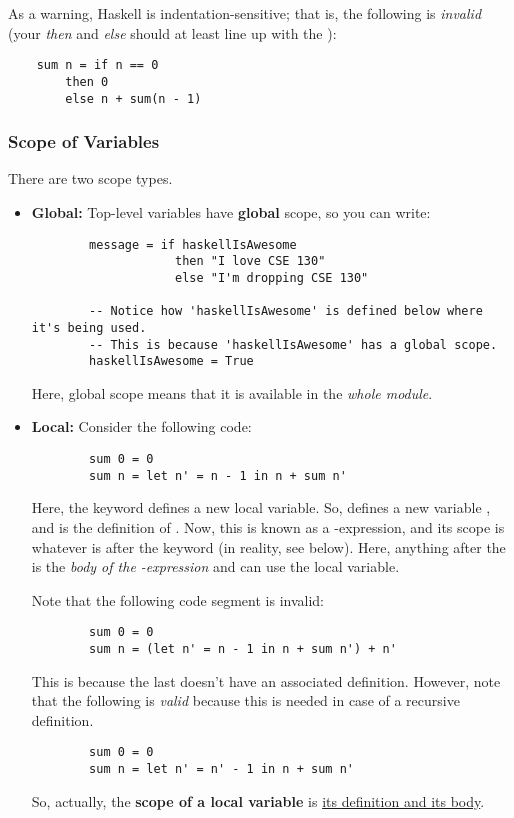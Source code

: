 \documentclass[letterpaper]{article}
\begin{document}
As a warning, Haskell is indentation-sensitive; that is, the following is \emph{invalid} (your \emph{then} and \emph{else} should at least line up with the ):
\begin{verbatim}
    sum n = if n == 0 
        then 0 
        else n + sum(n - 1)
\end{verbatim}

\subsubsection{Scope of Variables}
There are two scope types. 
\begin{itemize}
    \item \textbf{Global:} Top-level variables have \textbf{global} scope, so you can write: 
    \begin{verbatim}
        message = if haskellIsAwesome 
                    then "I love CSE 130"
                    else "I'm dropping CSE 130"
        
        -- Notice how 'haskellIsAwesome' is defined below where it's being used.
        -- This is because 'haskellIsAwesome' has a global scope.
        haskellIsAwesome = True 
    \end{verbatim}
    Here, global scope means that it is available in the \emph{whole module}.

    
    \item \textbf{Local:} Consider the following code: 
    \begin{verbatim}
        sum 0 = 0
        sum n = let n' = n - 1 in n + sum n'
    \end{verbatim}
    Here, the  keyword defines a new local variable. So,  defines a new variable , and  is the definition of . Now, this is known as a -expression, and its scope is whatever is after the  keyword (in reality, see below). Here, anything after the  is the \emph{body of the -expression} and can use the local variable.

    \bigskip 

    Note that the following code segment is invalid: 
    \begin{verbatim}
        sum 0 = 0
        sum n = (let n' = n - 1 in n + sum n') + n'
    \end{verbatim}
    This is because the last  doesn't have an associated definition. However, note that the following is \emph{valid} because this is needed in case of a recursive definition. 
    \begin{verbatim}
        sum 0 = 0
        sum n = let n' = n' - 1 in n + sum n'
    \end{verbatim}
    So, actually, the \textbf{scope of a local variable} is \underline{its definition and its body}.
\end{itemize}
\end{document}
